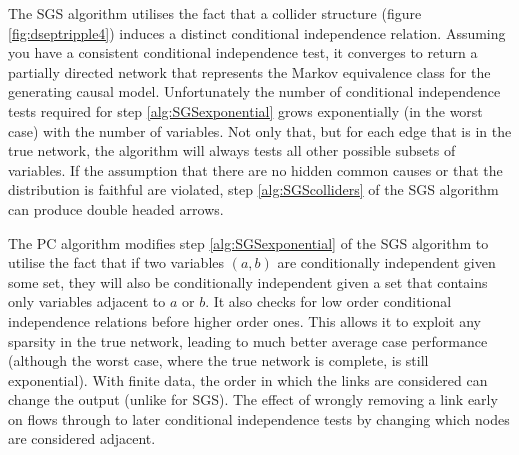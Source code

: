 The SGS algorithm utilises the fact that a collider structure (figure \ref{fig:dseptripple4}) induces a distinct conditional independence relation. Assuming you have a consistent conditional independence test, it converges to return a partially directed network that represents the Markov equivalence class for the generating causal model. Unfortunately the number of conditional independence tests required for step \ref{alg:SGSexponential} grows exponentially (in the worst case) with the number of variables. Not only that, but for each edge that is in the true network, the algorithm will always tests all other possible subsets of variables. If the assumption that there are no hidden common causes or that the distribution is faithful are violated, step \ref{alg:SGScolliders} of the SGS algorithm can produce double headed arrows.

The PC algorithm \citet{Sprites2000} modifies step \ref{alg:SGSexponential} of the SGS algorithm to utilise the fact that if two variables $(a,b)$ are conditionally independent given some set, they will also be conditionally independent given a set that contains only variables adjacent to $a$ or $b$. It also checks for low order conditional independence relations before higher order ones. This allows it to exploit any sparsity in the true network, leading to much better average case performance  \citep{Sprites2000} (although the worst case, where the true network is complete, is still exponential). With finite data, the order in which the links are considered can change the output (unlike for SGS). The effect of wrongly removing a link early on flows through to later conditional independence tests by changing which nodes are considered adjacent.

